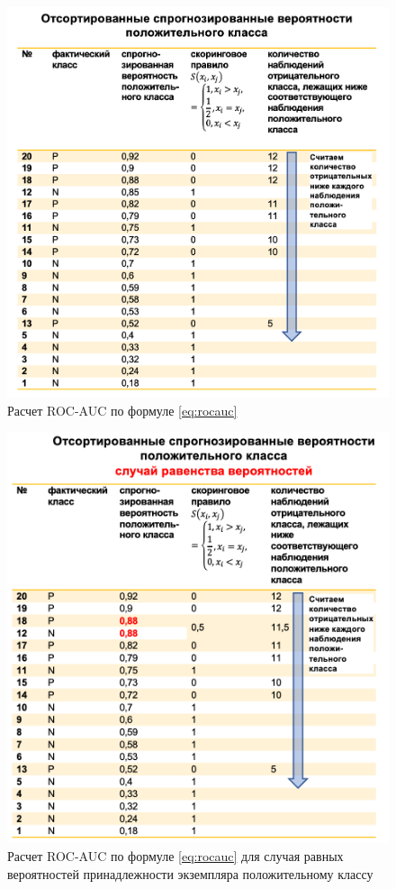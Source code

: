 \documentclass[%
	11pt,
	a4paper,
	utf8,
		]{article}
\begin{document}
\begin{figure}[h]
	\centering
	\includegraphics[scale=0.35]{figures/roc_auc1.png}
	\caption{ Расчет ROC-AUC по формуле \eqref{eq:rocauc}}\label{fig:roc_auc1}
\end{figure}

\begin{figure}[h]
	\centering
	\includegraphics[scale=0.35]{figures/roc_auc2.png}
	\caption{ Расчет ROC-AUC по формуле \eqref{eq:rocauc} для случая равных вероятностей принадлежности экземпляра положительному классу}\label{fig:roc_auc2}
\end{figure}
\end{document}

